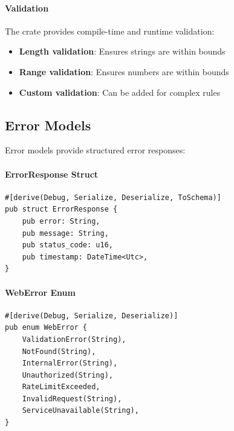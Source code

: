 \paragraph{Validation}

The  crate provides compile-time and runtime validation:

\begin{itemize}
  \item \textbf{Length validation}: Ensures strings are within bounds
  \item \textbf{Range validation}: Ensures numbers are within bounds
  \item \textbf{Custom validation}: Can be added for complex rules
\end{itemize}

\subsection{Error Models}

Error models provide structured error responses:

\paragraph{ErrorResponse Struct}

\begin{listing}[H]
\caption{Error response model}
\label{lst:models-error-response}
\begin{verbatim}
#[derive(Debug, Serialize, Deserialize, ToSchema)]
pub struct ErrorResponse {
    pub error: String,
    pub message: String,
    pub status_code: u16,
    pub timestamp: DateTime<Utc>,
}
\end{verbatim}
\end{listing}

\paragraph{WebError Enum}

\begin{listing}[H]
\caption{Web error enumeration}
\label{lst:models-web-error}
\begin{verbatim}
#[derive(Debug, Serialize, Deserialize)]
pub enum WebError {
    ValidationError(String),
    NotFound(String),
    InternalError(String),
    Unauthorized(String),
    RateLimitExceeded,
    InvalidRequest(String),
    ServiceUnavailable(String),
}
\end{verbatim}
\end{listing}

